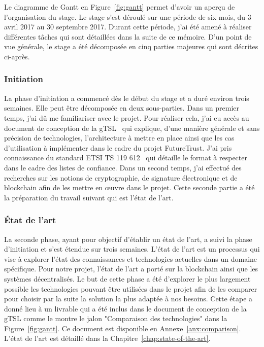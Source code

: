 \documentclass{tnreport}
\begin{document}
\clearpage

Le diagramme de Gantt en Figure~\ref{fig:gantt} permet d'avoir un aperçu de l'organisation du stage. Le stage s'est déroulé sur une période de six mois, du 3 avril 2017 au 30 septembre 2017. Durant cette période, j'ai été amené à réaliser différentes tâches qui sont détaillées dans la suite de ce mémoire. D'un point de vue générale, le stage a été décomposée en cinq parties majeures qui sont décrites ci-après.

\subsubsection{Initiation}

La phase d'initiation a commencé dès le début du stage et a duré environ trois semaines. 
Elle peut être décomposée en deux sous-parties. Dans un premier temps, j'ai dû me familiariser avec le projet. Pour réaliser cela, j'ai eu accès au document de conception de la gTSL~\cite{design-document} qui explique, d'une manière générale et sans précision de technologies, l'architecture à mettre en place ainsi que les cas d'utilisation à implémenter dans le cadre du projet FutureTrust. J'ai pris connaissance du standard ETSI TS 119 612~\cite{ETSITS119612} qui détaille le format à respecter dans le cadre des listes de confiance. Dans un second temps, j'ai effectué des recherches sur les notions de cryptographie, de signature électronique et de blockchain afin de les mettre en œuvre dans le projet. Cette seconde partie a été la préparation du travail suivant qui est l'état de l'art.

\subsubsection{État de l'art}

La seconde phase, ayant pour objectif d'établir un état de l'art, a suivi la phase d'initiation et s'est étendue sur trois semaines.
L'état de l'art est un processus qui vise à explorer l'état des connaissances et technologies actuelles dans un domaine spécifique. Pour notre projet, l'état de l'art a porté sur la blockchain ainsi que les systèmes  décentralisés. Le but de cette phase a été d'explorer le plus largement possible les technologies pouvant être utilisées dans le projet afin de les comparer pour choisir par la suite la solution la plus adaptée à nos besoins. Cette étape a donné lieu à un livrable qui a été inclus dans le document de conception de la gTSL comme le montre le jalon "Comparaison des technologies" dans la Figure~\ref{fig:gantt}. Ce document est disponible en Annexe~\ref{anx:comparison}. L'état de l'art est détaillé dans la Chapitre~\ref{chap:state-of-the-art}.
\end{document}
